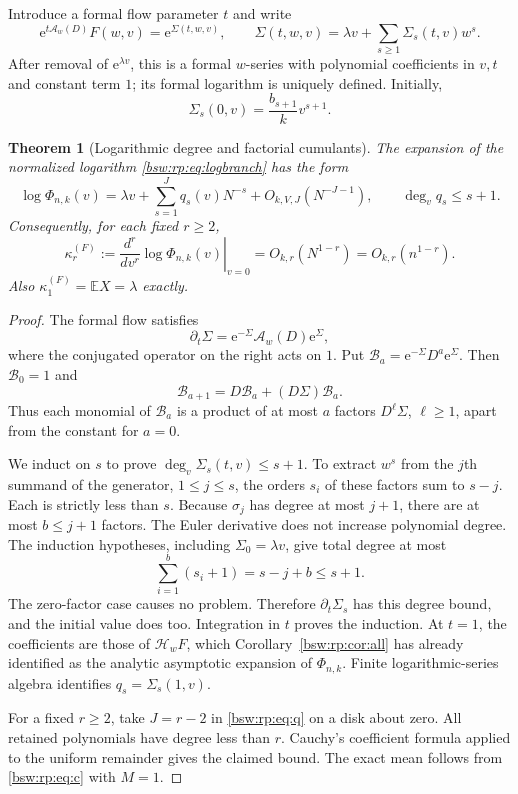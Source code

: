 \documentclass[11pt,letterpaper]{article}
\newtheorem{theorem}{Theorem}[section]
\theoremstyle{definition}
\theoremstyle{remark}
\newcommand{\EE}{\mathbb E}
\newcommand{\ee}{\mathrm e}
\begin{document}
Introduce a formal flow parameter $t$ and write
\[
 \ee^{t\mathcal A_w(D)}F(w,v)=\ee^{\Sigma(t,w,v)},\qquad
 \Sigma(t,w,v)=\lambda v+\sum_{s\ge1}\Sigma_s(t,v)w^s.
\]
After removal of $\ee^{\lambda v}$, this is a formal $w$-series with
polynomial coefficients in $v,t$ and constant term $1$; its formal logarithm
is uniquely defined.  Initially,
\[
 \Sigma_s(0,v)=\frac{b_{s+1}}k v^{s+1}.
\]

\begin{theorem}[Logarithmic degree and factorial cumulants]\label{bsw:rp:thm:cumulant}
The expansion of the normalized logarithm \eqref{bsw:rp:eq:logbranch} has
the form
\begin{equation}\label{bsw:rp:eq:q}
 \log\Phi_{n,k}(v)=\lambda v+\sum_{s=1}^J q_s(v)N^{-s}
 +O_{k,V,J}(N^{-J-1}),\qquad \deg_v q_s\le s+1.
\end{equation}
Consequently, for each fixed $r\ge2$,
\[
 \kappa_r^{(F)}:=\left.\frac{d^r}{dv^r}\log\Phi_{n,k}(v)\right|_{v=0}
 =O_{k,r}(N^{1-r})=O_{k,r}(n^{1-r}).
\]
Also $\kappa_1^{(F)}=\EE X=\lambda$ exactly.
\end{theorem}

\begin{proof}
The formal flow satisfies
\[
 \partial_t\Sigma=\ee^{-\Sigma}\mathcal A_w(D)\ee^{\Sigma},
\]
where the conjugated operator on the right acts on $1$.  Put
$\mathcal B_a=\ee^{-\Sigma}D^a\ee^{\Sigma}$.  Then $\mathcal B_0=1$ and
\[
 \mathcal B_{a+1}=D\mathcal B_a+(D\Sigma)\mathcal B_a.
\]
Thus each monomial of $\mathcal B_a$ is a product of at most $a$ factors
$D^\ell\Sigma$, $\ell\ge1$, apart from the constant for $a=0$.

We induct on $s$ to prove $\deg_v\Sigma_s(t,v)\le s+1$.  To extract $w^s$
from the $j$th summand of the generator, $1\le j\le s$, the orders $s_i$ of
these factors sum to $s-j$.  Each is strictly less than $s$.  Because
$\sigma_j$ has degree at most $j+1$, there are at most $b\le j+1$ factors.
The Euler derivative does not increase polynomial degree.  The induction
hypotheses, including $\Sigma_0=\lambda v$, give total degree at most
\[
 \sum_{i=1}^b(s_i+1)=s-j+b\le s+1.
\]
The zero-factor case causes no problem.  Therefore $\partial_t\Sigma_s$ has
this degree bound, and the initial value does too.  Integration in $t$
proves the induction.  At $t=1$, the coefficients are those of
$\mathcal H_wF$, which Corollary~\ref{bsw:rp:cor:all} has already
identified as the analytic asymptotic expansion of $\Phi_{n,k}$.  Finite
logarithmic-series algebra identifies $q_s=\Sigma_s(1,v)$.

For a fixed $r\ge2$, take $J=r-2$ in \eqref{bsw:rp:eq:q} on a disk about
zero.  All retained polynomials have degree less than $r$.  Cauchy's
coefficient formula applied to the uniform remainder gives the claimed
bound.  The exact mean follows from \eqref{bsw:rp:eq:c} with $M=1$.
\end{proof}
\end{document}
